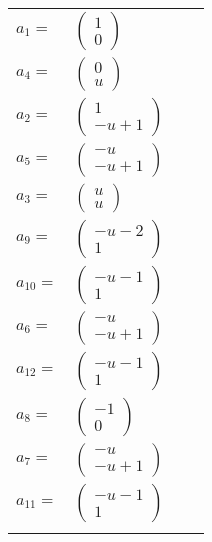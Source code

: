 \documentclass[1p]{elsarticle_modified}
\theoremstyle{definition}
\begin{document}
\begin{tabular}{m{7pt} m{180pt} m{7pt} m{180pt} }
\flushright $a_{1}=$&$\begin{pmatrix}1\\0\end{pmatrix}$ \\
\flushright $a_{4}=$&$\begin{pmatrix}0\\u\end{pmatrix}$ \\
\flushright $a_{2}=$&$\begin{pmatrix}1\\- u+1\end{pmatrix}$ \\
\flushright $a_{5}=$&$\begin{pmatrix}- u\\- u+1\end{pmatrix}$ \\
\flushright $a_{3}=$&$\begin{pmatrix}u\\u\end{pmatrix}$ \\
\flushright $a_{9}=$&$\begin{pmatrix}- u-2\\1\end{pmatrix}$ \\
\flushright $a_{10}=$&$\begin{pmatrix}- u-1\\1\end{pmatrix}$ \\
\flushright $a_{6}=$&$\begin{pmatrix}- u\\- u+1\end{pmatrix}$ \\
\flushright $a_{12}=$&$\begin{pmatrix}- u-1\\1\end{pmatrix}$ \\
\flushright $a_{8}=$&$\begin{pmatrix}-1\\0\end{pmatrix}$ \\
\flushright $a_{7}=$&$\begin{pmatrix}- u\\- u+1\end{pmatrix}$ \\
\flushright $a_{11}=$&$\begin{pmatrix}- u-1\\1\end{pmatrix}$\\&\end{tabular}
\end{document}
